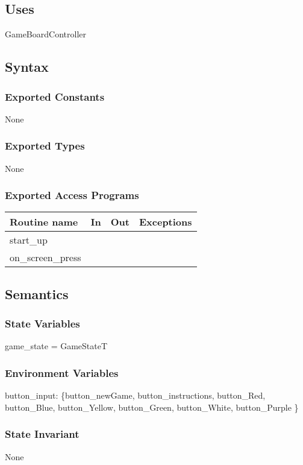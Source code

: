 \documentclass[12pt]{article}
\begin{document}
\subsection* {Uses}
GameBoardController

\subsection* {Syntax}

\subsubsection* {Exported Constants}
None

\subsubsection* {Exported Types}
None

\subsubsection* {Exported Access Programs}

\begin{tabular}{| l | l | l | l |}
\hline
\textbf{Routine name} & \textbf{In} & \textbf{Out} & \textbf{Exceptions}\\
\hline
start\_up & & & \\
\hline
on\_screen\_press & & & \\
\hline
\end{tabular}

\subsection* {Semantics}

\subsubsection* {State Variables}
game\_state = GameStateT

\subsubsection* {Environment Variables}

button\_input: \{button\_newGame, button\_instructions, button\_Red, button\_Blue, button\_Yellow, button\_Green, button\_White, button\_Purple  \}


\subsubsection* {State Invariant}
None
\end{document}
